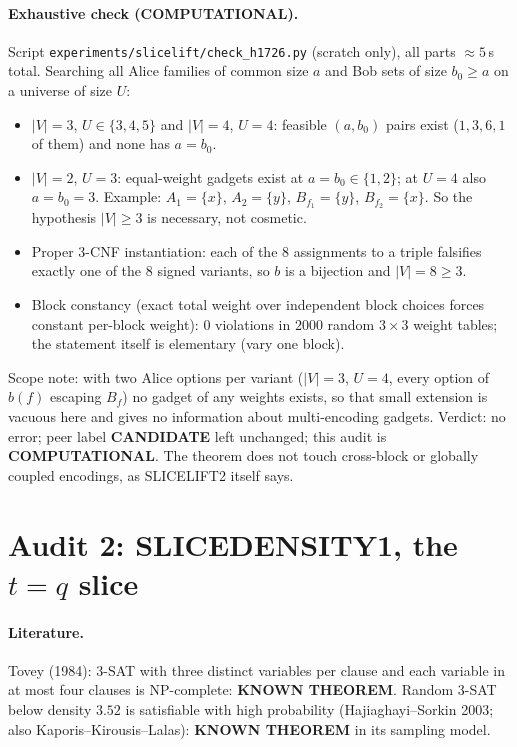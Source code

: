 \documentclass[11pt]{article}
\begin{document}
\paragraph{Exhaustive check (COMPUTATIONAL).} Script \texttt{experiments/slicelift/check\_h1726.py} (scratch only), all parts $\approx5$\,s total.
Searching all Alice families of common size $a$ and Bob sets of size $b_0\ge a$ on a universe of size $U$:
\begin{itemize}
\item $|V|=3$, $U\in\{3,4,5\}$ and $|V|=4$, $U=4$: feasible $(a,b_0)$ pairs exist ($1,3,6,1$ of them) and none has $a=b_0$.
\item $|V|=2$, $U=3$: equal-weight gadgets exist at $a=b_0\in\{1,2\}$; at $U=4$ also $a=b_0=3$. Example: $A_1=\{x\}$, $A_2=\{y\}$, $B_{f_1}=\{y\}$, $B_{f_2}=\{x\}$.
So the hypothesis $|V|\ge3$ is necessary, not cosmetic.
\item Proper 3-CNF instantiation: each of the $8$ assignments to a triple falsifies exactly one of the $8$ signed variants, so $b$ is a bijection and $|V|=8\ge3$.
\item Block constancy (exact total weight over independent block choices forces constant per-block weight): $0$ violations in $2000$ random $3\times3$ weight tables; the statement itself is elementary (vary one block).
\end{itemize}
Scope note: with two Alice options per variant ($|V|=3$, $U=4$, every option of $b(f)$ escaping $B_f$) no gadget of any weights exists, so that small extension is vacuous here and gives no information about multi-encoding gadgets.
Verdict: no error; peer label \textbf{CANDIDATE} left unchanged; this audit is \textbf{COMPUTATIONAL}. The theorem does not touch cross-block or globally coupled encodings, as SLICELIFT2 itself says.

\section*{Audit 2: SLICEDENSITY1, the $t=q$ slice}
\paragraph{Literature.} Tovey (1984): 3-SAT with three distinct variables per clause and each variable in at most four clauses is NP-complete: \textbf{KNOWN THEOREM}.
Random 3-SAT below density $3.52$ is satisfiable with high probability (Hajiaghayi--Sorkin 2003; also Kaporis--Kirousis--Lalas): \textbf{KNOWN THEOREM} in its sampling model.
\end{document}
